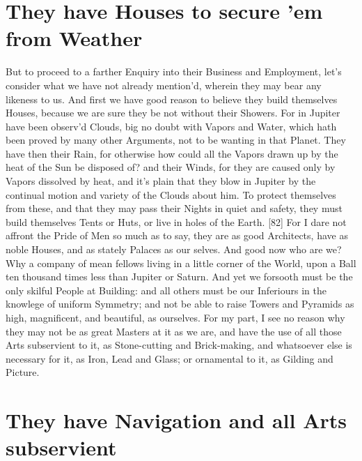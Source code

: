 \documentclass[letterpaper]{book}
\begin{document}
\section{They have Houses to secure 'em from Weather}

But to proceed to a farther Enquiry into their Business and Employment,
let's consider what we have not already mention'd, wherein they may bear any
likeness to us. And first we have good reason to believe they build
themselves Houses, because we are sure they be not without their Showers.
For in Jupiter have been observ'd Clouds, big no doubt with Vapors and
Water, which hath been proved by many other Arguments, not to be wanting in
that Planet. They have then their Rain, for otherwise how could all the
Vapors drawn up by the heat of the Sun be disposed of? and their Winds, for
they are caused only by Vapors dissolved by heat, and it's plain that they
blow in Jupiter by the continual motion and variety of the Clouds about him.
To protect themselves from these, and that they may pass their Nights in
quiet and safety, they must build themselves Tents or Huts, or live in holes
of the Earth. [82] For I dare not affront the Pride of Men so much as to
say, they are as good Architects, have as noble Houses, and as stately
Palaces as our selves. And good now who are we? Why a company of mean
fellows living in a little corner of the World, upon a Ball ten thousand
times less than Jupiter or Saturn. And yet we forsooth must be the only
skilful People at Building: and all others must be our Inferiours in the
knowlege of uniform Symmetry; and not be able to raise Towers and Pyramids
as high, magnificent, and beautiful, as ourselves. For my part, I see no
reason why they may not be as great Masters at it as we are, and have the
use of all those Arts subservient to it, as Stone-cutting and Brick-making,
and whatsoever else is necessary for it, as Iron, Lead and Glass; or
ornamental to it, as Gilding and Picture.


\section{They have Navigation and all Arts subservient}
\end{document}

